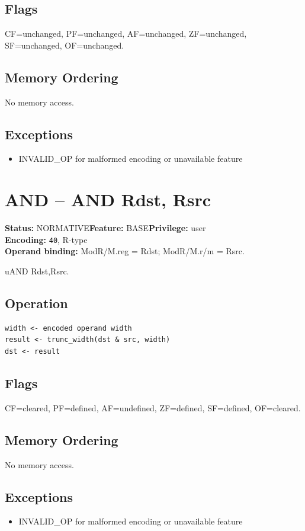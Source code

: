 \documentclass[10pt]{article}
\begin{document}
\subsection*{Flags}
CF=unchanged, PF=unchanged, AF=unchanged, ZF=unchanged, SF=unchanged, OF=unchanged.
\subsection*{Memory Ordering}
No memory access.
\subsection*{Exceptions}
\begin{itemize}
\item INVALID\_OP for malformed encoding or unavailable feature
\end{itemize}
\clearpage

\section{AND -- AND Rdst, Rsrc}
\textbf{Status:} NORMATIVE\quad \textbf{Feature:} BASE\quad \textbf{Privilege:} user\\
\textbf{Encoding:} \texttt{40}, R-type\\
\textbf{Operand binding:} ModR/M.reg = Rdst; ModR/M.r/m = Rsrc.

uAND Rdst,Rsrc.

\subsection*{Operation}
\begin{lstlisting}
width <- encoded operand width
result <- trunc_width(dst & src, width)
dst <- result
\end{lstlisting}
\subsection*{Flags}
CF=cleared, PF=defined, AF=undefined, ZF=defined, SF=defined, OF=cleared.
\subsection*{Memory Ordering}
No memory access.
\subsection*{Exceptions}
\begin{itemize}
\item INVALID\_OP for malformed encoding or unavailable feature
\end{itemize}
\clearpage
\end{document}
